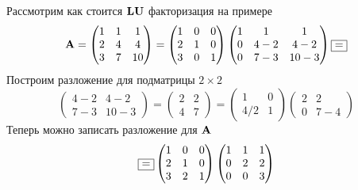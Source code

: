\documentclass[professionalfonts,compress,unicode]{beamer}
\begin{document}
{
	Рассмотрим как стоится ${\bf L}{\bf U}$ факторизация на примере
	$$
	{\bf A} = 
	\begin{pmatrix}
		1&1&1\\
		2&4&4\\
		3&7&10
	\end{pmatrix} =
	\begin{pmatrix}
		1&0&0\\
		2&1&0\\
		3&0&1
	\end{pmatrix}
	\begin{pmatrix}
		1&1&1\\
		0&4-2&4-2\\
		0&7-3&10-3
	\end{pmatrix}
	\fbox{=}
	$$
	Построим разложение для подматрицы $2\times2$
	$$
	\begin{pmatrix}
		4-2&4-2\\
		7-3&10-3
	\end{pmatrix} = 
	\begin{pmatrix}
		2&2\\
		4&7
	\end{pmatrix} = 
	\begin{pmatrix}
		1&0\\
		4/2&1
	\end{pmatrix}
	\begin{pmatrix}
		2&2\\
		0&7-4
	\end{pmatrix}
	$$
	Теперь можно записать разложение для ${\bf A}$
	$$
	\fbox{=}
	\begin{pmatrix}
		1&0&0\\
		2&1&0\\
		3&2&1
	\end{pmatrix}
	\begin{pmatrix}
		1&1&1\\
		0&2&2\\
		0&0&3
	\end{pmatrix}
	$$
}
\end{document}
